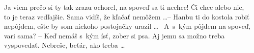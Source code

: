 Ja viem prečo si ty tak zrazu ochorel, na spoveď sa ti nechce! Či chce alebo nie,
to je teraz vedľajšie. Sama vidíš, že kľačať nemôžem \dots -- Hanbu ti do kostola
robiť nepôjdem, ešte by som niekoho postojačky urazil \dots -- A~s~kým pôjdem na
spoveď, vari sama? -- Keď nemáš s~kým ísť, zober si psa. Aj jemu sa možno treba
vyspovedať. Nebreše, beťár, ako treba \dots
